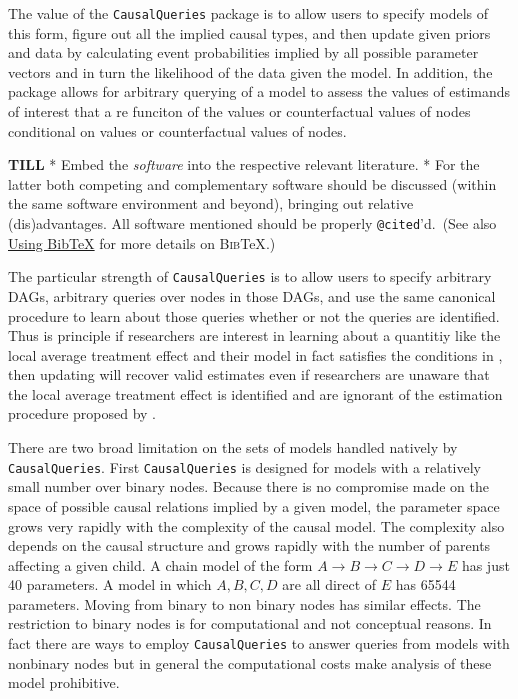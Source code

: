 \documentclass[
  article]{jss}
\begin{document}
The value of the \texttt{CausalQueries} package is to allow users to
specify models of this form, figure out all the implied causal types,
and then update given priors and data by calculating event probabilities
implied by all possible parameter vectors and in turn the likelihood of
the data given the model. In addition, the package allows for arbitrary
querying of a model to assess the values of estimands of interest that a
re funciton of the values or counterfactual values of nodes conditional
on values or counterfactual values of nodes.

\textbf{TILL} * Embed the \emph{software} into the respective relevant
literature. * For the latter both competing and complementary software
should be discussed (within the same software environment and beyond),
bringing out relative (dis)advantages. All software mentioned should be
properly \texttt{@cited}'d.~(See also
\protect\hyperlink{sec-bibtex}{Using BibTeX} for more details on
\textsc{Bib}{\TeX}.)

The particular strength of \texttt{CausalQueries} is to allow users to
specify arbitrary DAGs, arbitrary queries over nodes in those DAGs, and
use the same canonical procedure to learn about those queries whether or
not the queries are identified. Thus is principle if researchers are
interest in learning about a quantitiy like the local average treatment
effect and their model in fact satisfies the conditions in
\citet{angrist1996identification}, then updating will recover valid
estimates even if researchers are unaware that the local average
treatment effect is identified and are ignorant of the estimation
procedure proposed by \citet{angrist1996identification}.

There are two broad limitation on the sets of models handled natively by
\texttt{CausalQueries}. First \texttt{CausalQueries} is designed for
models with a relatively small number over binary nodes. Because there
is no compromise made on the space of possible causal relations implied
by a given model, the parameter space grows very rapidly with the
complexity of the causal model. The complexity also depends on the
causal structure and grows rapidly with the number of parents affecting
a given child. A chain model of the form
\(A \rightarrow B \rightarrow C \rightarrow D \rightarrow E\) has just
40 parameters. A model in which \(A, B, C, D\) are all direct of \(E\)
has 65544 parameters. Moving from binary to non binary nodes has similar
effects. The restriction to binary nodes is for computational and not
conceptual reasons. In fact there are ways to employ
\texttt{CausalQueries} to answer queries from models with nonbinary
nodes but in general the computational costs make analysis of these
model prohibitive.
\end{document}
